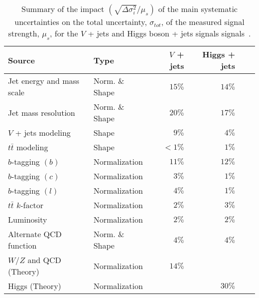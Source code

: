 \begin{table}[htpb]
 \centering
 \caption{
  Summary of the impact $(\sqrt{\Delta \sigma_i^2}/\mu_{s})$ of the main systematic uncertainties on the total uncertainty, $\sigma_{tot}$, of the measured signal strength, $\mu_{s}$, for the $V$ + jets and Higgs boson + jets signals signals~\cite{ATLAS-CONF-2018-052}.}
 \begin{adjustbox}{max width=\textwidth}
  \begin{tabular}{@{}llrrrr@{}}
   \toprule
   Source                    & Type           & $V$ + jets & Higgs + jets  \\ \midrule
   Jet energy and mass scale & Norm. \& Shape & $15\%$     & $14\%$ \\
   Jet mass resolution       & Norm. \& Shape & $20\%$     & $17\%$ \\
   $V$ + jets modeling       & Shape          & $9\%$      & $4\%$  \\
   $t\bar{t}$ modeling       & Shape          & $<1\%$     & $1\%$  \\
   $b$-tagging $(b)$         & Normalization  & $11\%$     & $12\%$ \\
   $b$-tagging $(c)$         & Normalization  & $3\%$      & $1\%$  \\
   $b$-tagging $(l)$         & Normalization  & $4\%$      & $1\%$  \\
   $t\bar{t}$ $k$-factor     & Normalization  & $2\%$      & $3\%$  \\
   Luminosity                & Normalization  & $2\%$      & $2\%$  \\
   Alternate QCD function    & Norm. \& Shape & $4\%$      & $4\%$  \\
   $W$/$Z$ and QCD (Theory)  & Normalization  & $14\%$     &        \\
   Higgs (Theory)            & Normalization  &            & $30\%$ \\
   \bottomrule
  \end{tabular}
 \end{adjustbox}
 \label{table:systematic_uncertainties}
\end{table}
